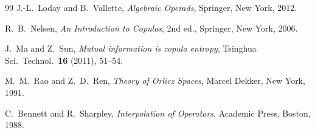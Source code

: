 \documentclass[11pt]{amsart}
\begin{document}
\begin{sloppypar}
\begin{thebibliography}{99}
J.-L.~Loday and B.~Vallette, \emph{Algebraic Operads}, Springer, New York, 2012.

R.~B.~Nelsen, \emph{An Introduction to Copulas}, 2nd ed., Springer, New York, 2006.

J.~Ma and Z.~Sun, \emph{Mutual information is copula entropy}, Tsinghua Sci.\ Technol.\ \textbf{16} (2011), 51--54.

M.~M.~Rao and Z.~D.~Ren, \emph{Theory of Orlicz Spaces}, Marcel Dekker, New York, 1991.

C.~Bennett and R.~Sharpley, \emph{Interpolation of Operators}, Academic Press, Boston, 1988.

\end{thebibliography}
\end{sloppypar}
\end{document}
